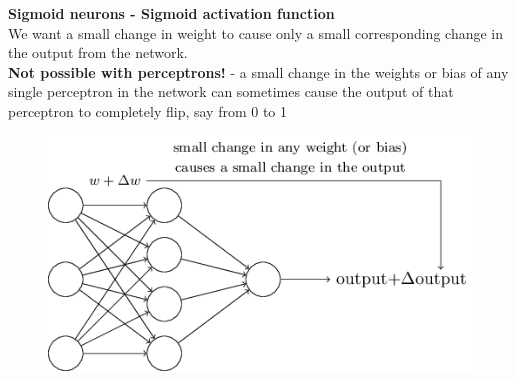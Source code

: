 \documentclass[10pt, compress]{beamer}
\begin{document}
\begin{frame}
  \vspace{0.6cm}
  \textbf{Sigmoid neurons - Sigmoid activation function} \\
  We want a small change in weight to cause only a small corresponding change in the output from the network. \\
  \textbf{Not possible with perceptrons!} - a small change in the weights or bias of any single perceptron in the network can sometimes cause the output of that perceptron to completely flip, say from 0 to 1
  \begin{figure}
    \includegraphics[width=.7\linewidth]{imgs/sigmoid_1}
  \end{figure}
\end{frame}
\end{document}

